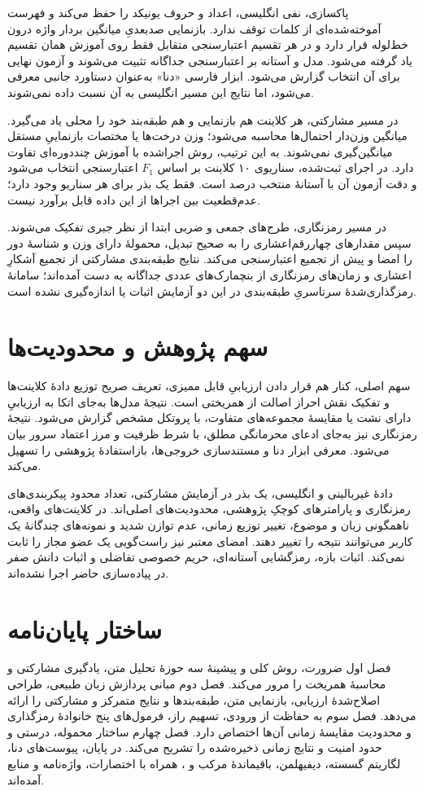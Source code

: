 پاکسازی، نفی انگلیسی، اعداد و حروف یونیکد را حفظ می‌کند و فهرست آموخته‌شده‌ای از کلمات توقف ندارد. بازنمایی صدبعدیِ میانگین بردار واژه درون خط‌لوله قرار دارد و در هر تقسیم اعتبارسنجی متقابل فقط روی آموزش همان تقسیم یاد گرفته می‌شود. مدل و آستانه بر اعتبارسنجی جداگانه تثبیت می‌شوند و آزمون نهایی برای آن انتخاب گزارش می‌شود. ابزار فارسی «دنا» به‌عنوان دستاورد جانبی معرفی می‌شود، اما نتایج این مسیر انگلیسی به آن نسبت داده نمی‌شوند.

در مسیر مشارکتی، هر کلاینت هم بازنمایی و هم طبقه‌بند خود را محلی یاد می‌گیرد. میانگین وزن‌دار احتمال‌ها محاسبه می‌شود؛ وزن درخت‌ها یا مختصات بازنماییِ مستقل میانگین‌گیری نمی‌شوند. به این ترتیب، روش اجراشده با آموزش چنددوره‌ای  تفاوت دارد. در اجرای ثبت‌شده، سناریوی ۱۰ کلاینت بر اساس $F_1$ اعتبارسنجی انتخاب می‌شود و دقت آزمون آن با آستانۀ منتخب  درصد است. فقط یک بذر برای هر سناریو وجود دارد؛ عدم‌قطعیت بین اجراها از این داده قابل برآورد نیست.

در مسیر رمزنگاری، طرح‌های جمعی و ضربی ابتدا از نظر جبری تفکیک می‌شوند. سپس  مقدارهای چهاررقم‌اعشاری را به صحیح تبدیل، محمولۀ دارای وزن و شناسۀ دور را امضا و پیش از تجمیع اعتبارسنجی می‌کند. نتایج طبقه‌بندی مشارکتی از تجمیع آشکارِ اعشاری و زمان‌های رمزنگاری از بنچمارک‌های عددی جداگانه به دست آمده‌اند؛ سامانۀ رمزگذاری‌شدۀ سرتاسریِ طبقه‌بندی در این دو آزمایش اثبات یا اندازه‌گیری نشده است.

\section*{سهم پژوهش و محدودیت‌ها}
سهم اصلی، کنار هم قرار دادن ارزیابیِ قابل ممیزی، تعریف صریح توزیع دادۀ کلاینت‌ها و تفکیک نقش احراز اصالت از همریختی است. نتیجۀ مدل‌ها به‌جای اتکا به ارزیابیِ دارای نشت یا مقایسۀ مجموعه‌های متفاوت، با پروتکل مشخص گزارش می‌شود. نتیجۀ رمزنگاری نیز به‌جای ادعای محرمانگی مطلق، با شرط ظرفیت و مرز اعتماد سرور بیان می‌شود. معرفی ابزار دنا و مستندسازی خروجی‌ها، بازاستفادۀ پژوهشی را تسهیل می‌کند.

دادۀ غیربالینی و انگلیسی، یک بذر در آزمایش مشارکتی، تعداد محدود پیکربندی‌های رمزنگاری و پارامترهای کوچکِ پژوهشی، محدودیت‌های اصلی‌اند. در کلاینت‌های واقعی، ناهمگونی زبان و موضوع، تغییر توزیع زمانی، عدم توازن شدید و نمونه‌های چندگانۀ یک کاربر می‌توانند نتیجه را تغییر دهند. امضای معتبر نیز راست‌گویی یک عضو مجاز را ثابت نمی‌کند. اثبات بازه، رمزگشایی آستانه‌ای، حریم خصوصی تفاضلی و اثبات دانش صفر در پیاده‌سازی حاضر اجرا نشده‌اند.

\section*{ساختار پایان‌نامه}
فصل اول ضرورت، روش کلی و پیشینۀ سه حوزۀ تحلیل متن، یادگیری مشارکتی و محاسبۀ همریخت را مرور می‌کند. فصل دوم مبانی پردازش زبان طبیعی، طراحی اصلاح‌شدۀ ارزیابی، بازنمایی متن، طبقه‌بندها و نتایج متمرکز و مشارکتی را ارائه می‌دهد. فصل سوم به حفاظت از ورودی، تسهیم راز، فرمول‌های پنج خانوادۀ رمزگذاری و محدودیت مقایسۀ زمانی آن‌ها اختصاص دارد. فصل چهارم ساختار محموله، درستی و حدود امنیت  و نتایج زمانی ذخیره‌شده را تشریح می‌کند. در پایان، پیوست‌های دنا، لگاریتم گسسته، دیفی\lr{--}هلمن، باقیماندۀ مرکب و ، همراه با اختصارات، واژه‌نامه و منابع آمده‌اند.
